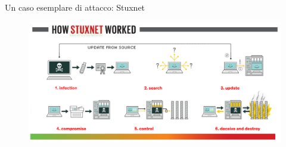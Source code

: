 \begin{frame}{Un caso esemplare di attacco: Stuxnet}
	\begin{figure}[h] 
		\includegraphics[scale=0.3,cfbox=blue_slides 1pt 0pt]{imgs/stuxnet_hsw.png}
	\end{figure}
\end{frame}

